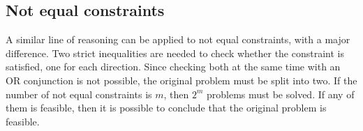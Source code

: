\documentclass[preview,border=12pt,varwidth]{report}
\begin{document}
\subsection*{Not equal constraints}

A similar line of reasoning can be applied to not equal constraints, with a major difference.
Two strict inequalities are needed to check whether the constraint is satisfied, one for each direction.
Since checking both at the same time with an OR conjunction is not possible, the original problem must be split into two.
If the number of not equal constraints is $m$, then $2^m$ problems must be solved.
If any of them is feasible, then it is possible to conclude that the original problem is feasible.
\end{document}

